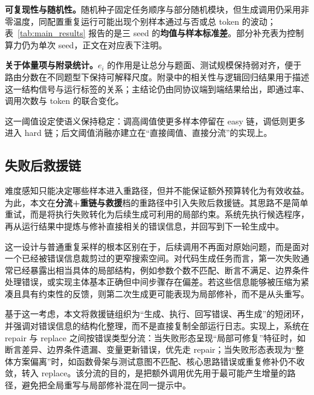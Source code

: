 \textbf{可复现性与随机性。}随机种子固定任务顺序与部分随机模块，但生成调用仍采用非零温度，同配置重复运行可能出现个别样本通过与否或总 token 的波动；表~\ref{tab:main_results} 报告的是三 seed 的\textbf{均值与样本标准差}。部分补充表为控制算力仍为单次 seed，正文在对应表下注明。

\textbf{关于体量项与附录统计。}$e_i$ 的作用是让总分与题面、测试规模保持弱对齐，便于路由分数在不同题型下保持可解释尺度。附录中的相关性与逻辑回归结果用于描述这一结构信号与运行标签的关系；主结论仍由同协议端到端结果给出，即通过率、调用次数与 token 的联合变化。

这一阈值设定使语义保持稳定：调高阈值使更多样本停留在 easy 链，调低则更多进入 hard 链；后文阈值消融亦建立在“直接阈值、直接分流”的实现上。

\subsection{失败后救援链}
\label{sec:rescue}

难度感知只能决定哪些样本进入重路径，但并不能保证额外预算转化为有效收益。为此，本文在\textbf{分流+重链与救援}档的重路径中引入失败后救援链。其思路不是简单重试，而是将执行失败转化为后续生成可利用的局部约束\cite{chen2024selfdebug,shinn2023reflexion,gou2024critic}。系统先执行候选程序，再从运行结果中提炼与修补直接相关的错误信息，并回写到下一轮生成中。

这一设计与普通重复采样的根本区别在于，后续调用不再面对原始问题，而是面对一个已经被错误信息裁剪过的更窄搜索空间。对代码生成任务而言，第一次失败通常已经暴露出相当具体的局部结构，例如参数个数不匹配、断言不满足、边界条件处理错误，或实现主体基本正确但中间步骤存在偏差。若这些信息能够被压缩为紧凑且具有约束性的反馈，则第二次生成更可能表现为局部修补，而不是从头重写。

基于这一考虑，本文将救援链组织为“生成、执行、回写错误、再生成”的短闭环，并强调对错误信息的结构化整理，而不是直接复制全部运行日志。实现上，系统在 repair 与 replace 之间按错误类型分流：当失败形态呈现“局部可修复”特征时，如断言差异、边界条件遗漏、变量更新错误，优先走 repair；当失败形态表现为“整体方案偏离”时，如函数骨架与测试意图不匹配、核心思路错误或重复修补仍不收敛，转入 replace。该分流的目的，是把额外调用优先用于最可能产生增量的路径，避免把全局重写与局部修补混在同一提示中。

